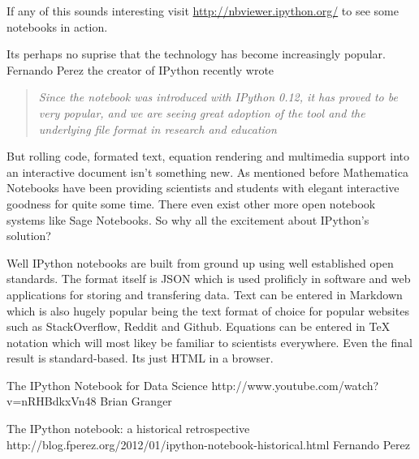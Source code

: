 \documentclass[11pt, a4paper]{article}  %
\begin{document}
\begin{multicols}{2}
If any of this sounds interesting visit \url{http://nbviewer.ipython.org/} to
see some notebooks in action. 

Its perhaps no suprise that the technology has
become increasingly popular. Fernando Perez the creator of IPython recently wrote

\begin{quote}
\textit{Since the notebook was introduced with IPython 0.12, it has proved to
be very popular, and we are seeing great adoption of the tool and the
underlying file format in research and education}
\end{quote}

But rolling code, formated text, equation rendering and multimedia support
into an interactive document isn't something new. As mentioned before
Mathematica Notebooks have been providing scientists and students with elegant
interactive goodness for quite some time. There even exist other more open
notebook systems like Sage Notebooks. So why all the excitement about
IPython's solution?

Well IPython notebooks are built from ground up using well established open
standards. The format itself is JSON which is used prolificly in software and
web applications for storing and transfering data. Text can be entered in
Markdown which is also hugely popular being the text format of choice for
popular websites such as StackOverflow, Reddit and Github. Equations can be
entered in TeX notation which will most likey be familiar to scientists
everywhere. Even the final result is standard-based. Its just HTML in a browser. 







\end{multicols}

The IPython Notebook for Data Science 
http://www.youtube.com/watch?v=nRHBdkxVn48 
Brian Granger

The IPython notebook: a historical retrospective
http://blog.fperez.org/2012/01/ipython-notebook-historical.html
Fernando Perez
\end{document}
